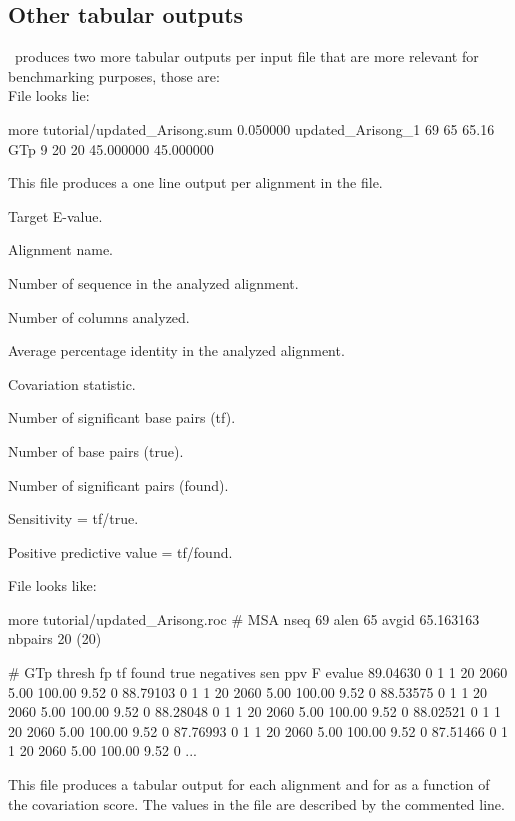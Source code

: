 \clearpage
\subsection{Other tabular outputs}

\rscape\ produces two more tabular outputs per input file that are
more relevant for benchmarking purposes, those are:\\

File  looks lie:

\begin{sreoutput}
more tutorial/updated_Arisong.sum 
0.050000        updated_Arisong_1       69      65      65.16    GTp 9 20 20 45.000000 45.000000 
\end{sreoutput}
This file produces a one line output per alignment in the file.
\begin{sreitems}{}
\item[\emprog{Column 1}] Target E-value.
\item[\emprog{Column 2}] Alignment name.
\item[\emprog{Column 3}] Number of sequence in the analyzed alignment.
\item[\emprog{Column 4}] Number of columns analyzed.
\item[\emprog{Column 5}] Average percentage identity in the analyzed alignment.
\item[\emprog{Column 6}] Covariation statistic.
\item[\emprog{Column 7}] Number of significant base pairs (tf).
\item[\emprog{Column 8}] Number of base pairs (true).
\item[\emprog{Column 9}] Number of significant pairs (found).
\item[\emprog{Column 10}] Sensitivity = tf/true.
\item[\emprog{Column 11}] Positive predictive value = tf/found.

\end{sreitems}

File  looks like:
\begin{sreoutput}
more tutorial/updated_Arisong.roc
# MSA nseq 69 alen 65 avgid 65.163163 nbpairs 20 (20)

# GTp thresh fp tf found true negatives sen ppv F evalue
89.04630 0 1 1 20 2060 5.00 100.00 9.52 0
88.79103 0 1 1 20 2060 5.00 100.00 9.52 0
88.53575 0 1 1 20 2060 5.00 100.00 9.52 0
88.28048 0 1 1 20 2060 5.00 100.00 9.52 0
88.02521 0 1 1 20 2060 5.00 100.00 9.52 0
87.76993 0 1 1 20 2060 5.00 100.00 9.52 0
87.51466 0 1 1 20 2060 5.00 100.00 9.52 0
...
\end{sreoutput}

This file produces a tabular output for each alignment and for as a
function of the covariation score. The values in the file are
described by the commented line.
